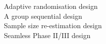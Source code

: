 \documentclass[preview]{standalone}
\begin{document}
Adaptive randomisation design\\A group sequential design\\Sample size re-estimation design\\Seamless Phase II/III design\\
\end{document}
